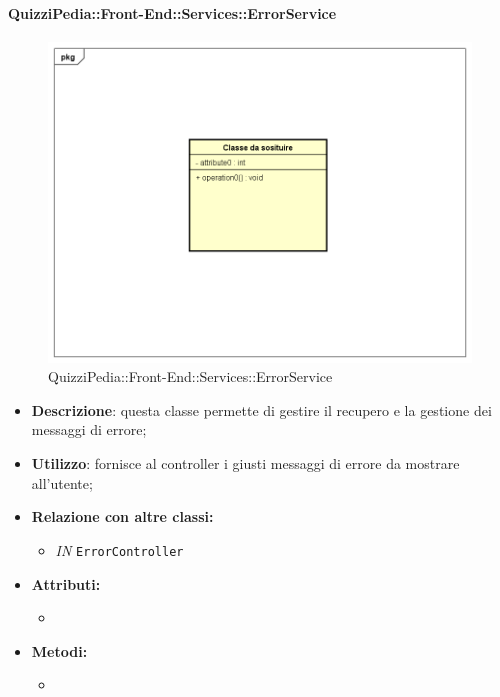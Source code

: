 \paragraph{QuizziPedia::Front-End::Services::ErrorService}
\begin{figure}
	\centering
	\includegraphics[scale=0.45]{UML/Classi/Front-End/Temporanea.png}
	\caption{QuizziPedia::Front-End::Services::ErrorService}
\end{figure}
\begin{itemize}
	\item \textbf{Descrizione}: questa classe permette di gestire il recupero e la gestione dei messaggi di errore;
	\item \textbf{Utilizzo}: fornisce al controller i giusti messaggi di errore da mostrare all'utente;
	\item \textbf{Relazione con altre classi:}
	\begin{itemize}
		\item \textit{IN} \texttt{ErrorController} 
	\end{itemize}
	\item \textbf{Attributi:}
	\begin{itemize}
		\item 
	\end{itemize}
	\item \textbf{Metodi:}
	\begin{itemize}
		\item 
	\end{itemize}
\end{itemize}

